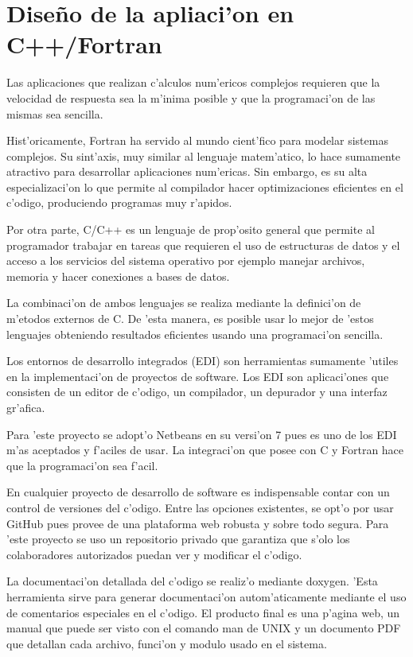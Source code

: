 \section{Dise\~no de la apliaci'on en C++/Fortran}
  Las aplicaciones que realizan c'alculos num'ericos complejos requieren que la velocidad de respuesta sea la m'inima posible y que
  la programaci'on de las mismas sea sencilla.

  Hist'oricamente, Fortran ha servido al mundo cient'fico para modelar sistemas complejos. Su sint'axis, 
  muy similar al lenguaje matem'atico, lo hace sumamente atractivo para desarrollar aplicaciones num'ericas. Sin embargo,
  es su alta especializaci'on lo que permite al compilador hacer optimizaciones eficientes en el c'odigo, produciendo
  programas muy r'apidos.

  Por otra parte, C/C++ es un lenguaje de prop'osito general que permite al programador trabajar en tareas que requieren
  el uso de estructuras de datos y el acceso a los servicios del sistema operativo por ejemplo manejar archivos, memoria y hacer 
  conexiones a bases de datos.

  La combinaci'on de ambos lenguajes se realiza mediante la definici'on de m'etodos externos de C. De 'esta manera, es posible
  usar lo mejor de 'estos lenguajes obteniendo resultados eficientes usando una programaci'on sencilla.


  Los entornos de desarrollo integrados (EDI) son herramientas sumamente 'utiles en la implementaci'on de proyectos de software.
  Los EDI son aplicaci'ones que consisten de un editor de c'odigo, un compilador, un depurador y una interfaz gr'afica.

  Para 'este proyecto se adopt'o Netbeans en su versi'on 7 pues es uno de los EDI m'as aceptados y f'aciles de usar. La integraci'on
  que posee con C y Fortran hace que la programaci'on sea f'acil.

  En cualquier proyecto de desarrollo de software es indispensable contar con un control de versiones del c'odigo.
  Entre las opciones existentes, se opt'o por usar GitHub pues provee de una plataforma web robusta y sobre todo segura. 
  Para 'este proyecto se uso un repositorio privado que garantiza que s'olo los colaboradores autorizados puedan ver y modificar el c'odigo.

  La documentaci'on detallada del c'odigo se realiz'o mediante doxygen. 'Esta herramienta sirve para generar
  documentaci'on autom'aticamente mediante el uso de comentarios especiales en el c'odigo. El producto final es una p'agina web, un manual 
  que puede ser visto con el comando man de UNIX y un documento PDF que detallan cada archivo, funci'on y modulo usado en el sistema.
  

